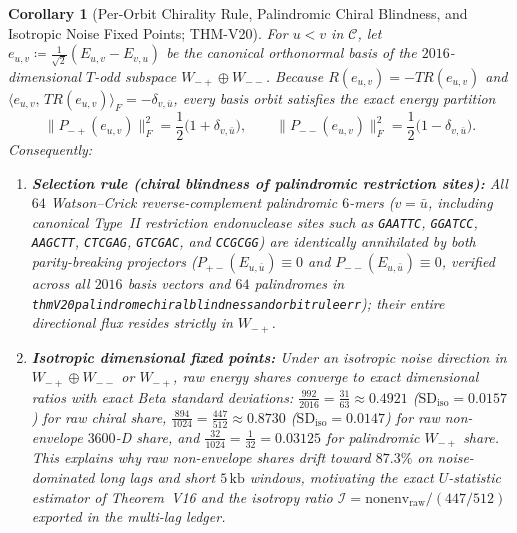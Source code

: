 \documentclass[11pt, a4paper]{article}
\newtheorem{corollary}[theorem]{Corollary}
\DeclareRobustCommand{\_}{\textunderscore\allowbreak}
\begin{document}
\begin{corollary}[Per-Orbit Chirality Rule, Palindromic Chiral Blindness, and Isotropic Noise Fixed Points; THM-V20]
\label{cor:v20_pal_iso}
For $u < v$ in $\mathcal{C}$, let $e_{u,v} \coloneqq \frac{1}{\sqrt{2}}(E_{u,v} - E_{v,u})$ be the canonical orthonormal basis of the $2016$-dimensional $T$-odd subspace $W_{-+} \oplus W_{--}$. Because $R(e_{u,v}) = -T R(e_{u,v})$ and $\langle e_{u,v},\, T R(e_{u,v})\rangle_F = -\delta_{v,\bar{u}}$, every basis orbit satisfies the exact energy partition
\begin{equation}
    \|P_{-+}(e_{u,v})\|_F^2 = \frac{1}{2}\bigl(1 + \delta_{v,\bar{u}}\bigr), \qquad
    \|P_{--}(e_{u,v})\|_F^2 = \frac{1}{2}\bigl(1 - \delta_{v,\bar{u}}\bigr).
\end{equation}
Consequently:
\begin{enumerate}
    \item \textbf{Selection rule (chiral blindness of palindromic restriction sites):} All $64$ Watson--Crick reverse-complement palindromic $6$-mers ($v = \bar{u}$, including canonical Type~II restriction endonuclease sites such as \texttt{GAATTC}, \texttt{GGATCC}, \texttt{AAGCTT}, \texttt{CTCGAG}, \texttt{GTCGAC}, and \texttt{CCGCGG}) are identically annihilated by both parity-breaking projectors ($P_{+-}(E_{u,\bar{u}}) \equiv 0$ and $P_{--}(E_{u,\bar{u}}) \equiv 0$, verified across all $2016$ basis vectors and $64$ palindromes in \texttt{thmV20\_palindrome\_chiral\_blindness\_and\_orbit\_rule\_err}); their entire directional flux resides strictly in $W_{-+}$.
    \item \textbf{Isotropic dimensional fixed points:} Under an isotropic noise direction in $W_{-+} \oplus W_{--}$ or $W_{-+}$, raw energy shares converge to exact dimensional ratios with exact Beta standard deviations: $\frac{992}{2016} = \frac{31}{63} \approx 0.4921$ ($\mathrm{SD}_{\mathrm{iso}} = 0.0157$) for raw chiral share, $\frac{894}{1024} = \frac{447}{512} \approx 0.8730$ ($\mathrm{SD}_{\mathrm{iso}} = 0.0147$) for raw non-envelope $3600$-D share, and $\frac{32}{1024} = \frac{1}{32} = 0.03125$ for palindromic $W_{-+}$ share. This explains why raw non-envelope shares drift toward $87.3\%$ on noise-dominated long lags and short $5\,\mathrm{kb}$ windows, motivating the exact $U$-statistic estimator of Theorem~V16 and the isotropy ratio $\mathcal{I} = \mathrm{nonenv}_{\mathrm{raw}} / (447/512)$ exported in the multi-lag ledger.
\end{enumerate}
\end{corollary}
\end{document}
